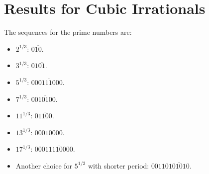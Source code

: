 
\section{Results for Cubic Irrationals}

\begin{example}
  The sequences for the prime numbers are:
  \begin{itemize}
    \item $2^{1/3}$: $0\overline{10}$.
    \item $3^{1/3}$: $01\overline{01}$.
    \item $5^{1/3}$: $0\overline{00111000}$.
    \item $7^{1/3}$: $0\overline{010100}$.
    \item $11^{1/3}$: $0\overline{1100}$.
    \item $13^{1/3}$: $00\overline{010000}$.
    \item $17^{1/3}$: $000\overline{11110000}$.
    \item Another choice for $5^{1/3}$ with shorter period: $00110\overline{101010}$.
  \end{itemize}
\end{example}

